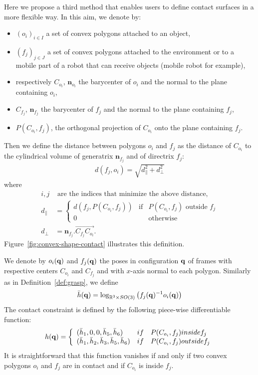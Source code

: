 Here we propose a third method that enables users to define contact surfaces in a more flexible way. In this aim, we denote by:
\begin{itemize}
\item $(o_i)_{i\in I}$ a set of convex polygons attached to an object,
\item $(f_j)_{j\in J}$ a set of convex polygons attached to the environment or to a mobile part of a robot that can receive objects (mobile robot for example),
\item respectively $C_{o_i}$, $\mathbf{n}_{o_i}$ the barycenter of $o_i$ and the normal to the plane containing $o_i$,
\item $C_{f_j}$, $\mathbf{n}_{f_j}$ the barycenter of $f_j$ and the normal to the plane containing $f_j$,
\item $P(C_{o_i},f_j)$, the orthogonal projection of $C_{o_i}$ onto the plane containing $f_j$.
\end{itemize}
Then we define the distance between polygons $o_i$ and $f_j$ as the distance of $C_{o_i}$ to the cylindrical volume of generatrix $\mathbf{n}_{f_j}$ and of directrix $f_j$:
\begin{align}\label{eq:contact-distance}
  d(f_j,o_i) = \sqrt{d_{\parallel}^2 + d_{\perp}^2}
\end{align}
where
\begin{align*}
  i,j & \mbox{ are the indices that minimize the above distance,}\\
d_{\parallel} &= \left\{\begin{array}{lll} d(f_j,P(C_{o_i},f_j))&\mbox{if}& P(C_{o_i},f_j)\mbox{ outside } f_j\\
0 & & \mbox{otherwise}
\end{array}\right. \\
d_{\perp} &= \mathbf{n}_{f_j}.\vec{C_{f_j}C_{o_i}}.
\end{align*}
Figure~\ref{fig:convex-shape-contact} illustrates this definition.

We denote by $o_i(\mathbf{q})$ and $f_j(\mathbf{q})$ the poses in configuration $\mathbf{q}$ of frames with respective centers $C_{o_i}$ and $C_{f_j}$ and with $x$-axis normal to each polygon. Similarly as in Definition~\ref{def:grasp}, we define
\begin{equation}\label{eq:convex-shape-contact-hbar}
\bar{h}(\conf) = \log_{\reals^3\times SO(3)} \left(f_{j}(\conf)^{-1}o_i(\conf)\right)
\end{equation}
The contact constraint is defined by the following piece-wise differentiable function:
\begin{equation}\label{eq:convex-shape-contact}
h(\conf) = \left\{\begin{array}{lll}(\bar{h}_1,0,0,\bar{h}_5,\bar{h}_6)&
\mbox{if} & P(C_{o_i},f_j)\mbox{ inside } f_j\\
(\bar{h}_1,\bar{h}_2,\bar{h}_3,\bar{h}_5,\bar{h}_6)&
\mbox{if} & P(C_{o_i},f_j)\mbox{ outside } f_j\end{array}\right.
\end{equation}
It is straightforward that this function vanishes if and only if two convex polygons $o_i$ and $f_j$ are in contact and if $C_{o_i}$ is inside $f_j$.

